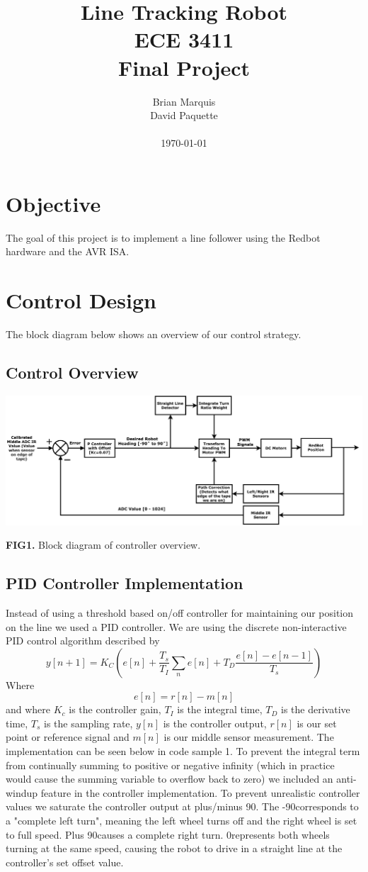 \documentclass{article}
\title{\textbf{Line Tracking Robot}\\ ECE 3411 \\ Final Project}
\author{Brian Marquis\\ David Paquette \\ \\ \today}
\date{}
\begin{document}
\maketitle

\tableofcontents
 \newpage
\section{Objective}
The goal of this project is to implement a line follower using the Redbot hardware and the AVR ISA. 
\section{Control Design}
The block diagram below shows an overview of our control strategy.
\subsection{Control Overview}
\begin{center}
\includegraphics[scale=.43]{BD}
\centering
\end{center}
\textbf{FIG1.} Block diagram of controller overview. 

\subsection{PID Controller Implementation}

Instead of using a threshold based on/off controller for maintaining our position on the line we used a PID controller. We are using the discrete non-interactive PID control algorithm described by
\[ y[n+1] = K_C\left(e[n]+\frac{T_s}{T_I}\sum_{n} e[n]+T_D\frac{e[n]-e[n-1]}{T_s} \right)\]
Where
  \[e[n]=r[n]-m[n]\]
   and where $K_c$ is the controller gain, $T_I$ is the integral time,  $T_D$ is the derivative time,  $T_s$ is the sampling rate, $y[n]$ is the controller output, $r[n]$ is our set point or reference signal and $m[n]$ is our middle sensor measurement. The implementation can be seen below in code sample 1. To prevent the integral term from continually summing to positive or negative infinity (which in practice would cause the summing variable to overflow back to zero) we included an anti-windup feature in the controller implementation. To prevent unrealistic controller values we saturate the controller output at plus/minus 90\degree. The -90\degree  corresponds to a "complete left turn", meaning the left wheel turns off and the right wheel is set to full speed. Plus 90\degree  causes a complete right turn. 0\degree  represents both wheels turning at the same speed, causing the robot to drive in a straight line at the controller's set offset value.\\\\
\end{document}
